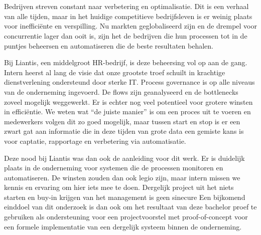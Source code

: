 
\chapter{}%
\label{ch:inleiding}
\section{}%
\label{sec:probleemstelling}

Bedrijven streven constant naar verbetering en optimalisatie. Dit is een verhaal van alle tijden, maar in het huidige competitieve bedrijfsleven is er weinig plaats voor inefficiënte en verspilling. Nu markten geglobaliseerd zijn en de drempel voor concurrentie lager dan ooit is, zijn het de bedrijven die hun processen tot in de puntjes beheersen en automatiseren die de beste resultaten behalen.\newline

Bij Liantis, een middelgroot HR-bedrijf, is deze beheersing vol op aan de gang. Intern heerst al lang de visie dat onze grootste troef schuilt in krachtige dienstverlening ondersteund door sterke IT. Process governance is op alle niveaus van de onderneming ingevoerd. De flows zijn geanalyseerd en de bottlenecks zoveel mogelijk weggewerkt. Er is echter nog veel potentieel voor grotere winsten in efficiëntie. We weten wat “de juiste manier” is om een proces uit te voeren en medewerkers volgen dit zo goed mogelijk, maar tussen start en stop is er een zwart gat aan informatie die in deze tijden van grote data een gemiste kans is voor captatie, rapportage en verbetering via automatisatie.\newline 

Deze nood bij Liantis was dan ook de aanleiding voor dit werk. Er is duidelijk plaats in de onderneming voor systemen die de processen monitoren en automatiseren. De winsten zouden dan ook legio zijn, maar intern missen we kennis en ervaring om hier iets mee te doen. Dergelijk project uit het niets starten en buy-in krijgen van het management is geen sinecure Een bijkomend einddoel van dit onderzoek is dan ook om het resultaat van deze bachelor proef te gebruiken als ondersteuning voor een projectvoorstel met proof-of-concept voor een formele implementatie van een dergelijk systeem binnen de onderneming.
